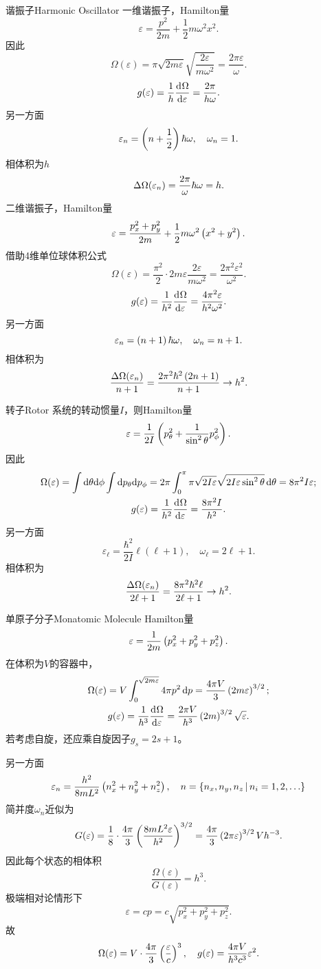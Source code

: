 \begin{example}{谐振子}{Harmonic Oscillator}
	一维谐振子，Hamilton量
	\[
		\varepsilon=\frac{p^2}{2m}+\frac12m\omega^2x^2.
	\]
	因此
	\[
		\Omega(\varepsilon)=\pi\sqrt{2m\varepsilon}\sqrt{\frac{2\varepsilon}{m\omega^2}}=\frac{2\pi\varepsilon}\omega.
	\]
	\[
		g(\varepsilon)=\frac1h\frac{\mathrm{d}^{{}}\Omega}{\mathrm{d}{\varepsilon}^{{}}}=\frac{2\pi}{h\omega}.
	\]
	另一方面
	\[
		\varepsilon_n=\left(n+\frac12\right)\hbar\omega,\quad\omega_n=1.
	\]
	相体积为$h$
	\[
		\Delta\Omega(\varepsilon_n)=\frac{2\pi}\omega\hbar\omega=h.
	\]
	\tcblower
	二维谐振子，Hamilton量
	\[
		\varepsilon=\frac{p_x^2+p_y^2}{2m}+\frac12m\omega^2\left(x^2+y^2\right).
	\]
	借助4维单位球体积公式
	\[
		\Omega(\varepsilon)=\frac{\pi^2}2\cdot2m\varepsilon\frac{2\varepsilon}{m\omega^2}=\frac{2\pi^2\varepsilon^2}{\omega^2}.
	\]
	\[
		g(\varepsilon)=\frac1{h^2 }\frac{\mathrm{d}^{{}}\Omega}{\mathrm{d}{\varepsilon}^{{}}}=\frac{4\pi^2\varepsilon}{h^2\omega^2}.
	\]
	另一方面
	\[
		\varepsilon_n=\left(n+1\right)\hbar\omega,\quad\omega_n=n+1.
	\]
	相体积为
	\[
		\frac{\Delta\Omega(\varepsilon_n)}{n+1}=\frac{2\pi^2\hbar^2\left(2n+1\right)}{n+1}\to h^2.
	\]
\end{example}
\begin{example}{转子}{Rotor}
	系统的转动惯量$I$，则Hamilton量
	\[
		\varepsilon=\frac1{2I}\left(p_\theta^2+\frac1{\sin^2\theta}p_\phi^2\right).
	\]
	因此
	\begin{gather}\notag
		\Omega(\varepsilon)=\int\mathop{}\!\mathrm{d}\theta\mathrm{d}\phi\int\mathop{}\!\mathrm{d} p_\theta\mathrm{d} p_\phi=2\pi\int_0^\pi\pi\sqrt{2I\varepsilon}\sqrt{2I\varepsilon\sin^2\theta}\mathop{}\!\mathrm{d}\theta=8\pi^2I\varepsilon;\\
		g(\varepsilon)=\frac1{h^2}\frac{\mathrm{d}^{{}}\Omega}{\mathrm{d}{\varepsilon}^{{}}}=\frac{8\pi^2I}{h^2}.
	\end{gather}
	另一方面
	\[
		\varepsilon_\ell=\frac{\hbar^2}{2I}\ell(\ell+1),\quad\omega_\ell=2\ell+1.
	\]
	相体积为
	\[
		\frac{\Delta\Omega(\varepsilon_n)}{2\ell+1}=\frac{8\pi^2\hbar^2\ell}{2\ell+1}\to h^2.
	\]
\end{example}
\begin{example}{单原子分子}{Monatomic Molecule}
	Hamilton量
	\[
		\varepsilon=\frac1{2m}\left(p_x^2+p_y^2+p_z^2\right).
	\]
	在体积为$V$的容器中，
	\begin{gather}\notag
		\Omega(\varepsilon)=V\int_0^{\sqrt{2m\varepsilon}}4\pi p^2\mathop{}\!\mathrm{d} p=\frac{4\pi V}3\left(2m\varepsilon\right)^{3/2};\\
		g(\varepsilon)=\frac1{h^3}\frac{\mathrm{d}^{{}}\Omega}{\mathrm{d}{\varepsilon}^{{}}}=\frac{2\pi V}{h^3}\left(2m\right)^{3/2}\sqrt\varepsilon.
	\end{gather}
	若考虑自旋，还应乘自旋因子$g_s=2s+1$。

	另一方面
	\[
		\varepsilon_n=\frac{h^2}{8mL^2}\left(n_x^2+n_y^2+n_z^2\right),\quad n=\left\{n_x,n_y,n_z\,\middle\vert\,n_i=1,2,\ldots\right\}
	\]
	简并度$\omega_n$近似为
	\[
		G(\varepsilon)=\frac18\cdot\frac{4\pi}3\left(\frac{8mL^2\varepsilon}{h^2}\right)^{3/2}=\frac{4\pi}{3}\left(2\pi\varepsilon\right)^{3/2}Vh^{-3}.
	\]
	因此每个状态的相体积
	\[
		\frac{\Omega(\varepsilon)}{G(\varepsilon)}=h^3.
	\]
	\tcblower
	极端相对论情形下
	\[
		\varepsilon=cp=c\sqrt{p_x^2+p_y^2+p_z^2}.
	\]
	故
	\begin{align}
		\Omega(\varepsilon)=V\cdot\frac{4\pi}3\left(\frac\varepsilon{c}\right)^3,\quad g(\varepsilon)=\frac{4\pi V}{h^3c^3}\varepsilon^2.
	\end{align}
\end{example}
